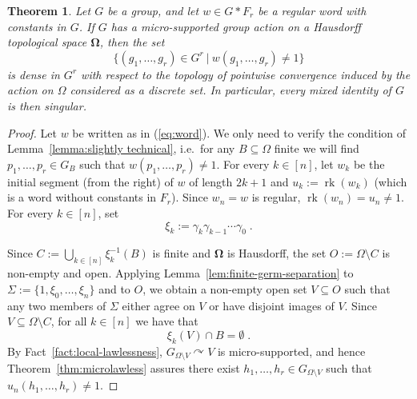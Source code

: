 \documentclass{article}
\newtheorem{theorem}{Theorem}[section]
\theoremstyle{remark}
\theoremstyle{definition}
\def\acts{\curvearrowright}
\DeclareMathOperator{\rk}{rk}
\DeclareMathOperator{\ppww}{pw}
\newcommand{\spOm}{\bm{\Omega}}
\newcommand{\pwom}{\tau_{\ppww}^{\spOm}}
\begin{document}
{\begin{theorem}\label{thm:micro-supported-mixed-identities} Let $G$ be a group, and let $w\in G*F_r$ be a regular word with constants in $G$. If $G$ has a micro-supported group action on a Hausdorff topological space $\spOm$, then the set
\[
  \{(g_1,\ldots,g_r)\in G^r\ \vert \ w(g_1,\ldots,g_r) {\neq} 1\}
\]
is dense in $G^r$ with respect to the topology of pointwise convergence %
 induced by the action {on $\Omega$ considered as a discrete set}. 
In particular, every mixed identity of $G$ is then  singular.
\end{theorem}
\begin{proof}
Let $w$ be written  as in (\ref{eq:word}).  We only need to verify the condition of Lemma~\ref{lemma:slightly technical}, i.e.~for any  $B\subseteq \Omega$ finite we will find $p_1, \dots, p_r\in G_B$ such that ${w}(p_1, \dots, p_r)\neq 1$. For every $k\in [n]$, let ${w}_k$ be the %
{initial segment (from the right)} 
of ${w}$ of length $2k+1$ and $u_k:=\rk({w}_k)$ (which is a word without constants in $F_r$). %
Since ${w}_n=w$ is regular, $\rk({w}_n)=u_n\neq 1$. For every $k\in [n]$, set
\[
  \xi_k:=\gamma_k\gamma_{k-1}\cdots\gamma_0\;.
\]

 Since $
C:=\bigcup_{k\in [n]}\xi_k^{-1}(B)$
is finite and $\spOm$ is Hausdorff, the set $O:=\Omega\setminus C$ is non-empty and open. Applying 
Lemma~\ref{lem:finite-germ-separation} to $ \Sigma:=\{1,\xi_0,\ldots,\xi_n\}$
and to $O$, we obtain a non-empty open set $V\subseteq O$ such that any two
members of $\Sigma$ either agree on $V$ or have disjoint images of $V$. 
Since $V\subseteq \Omega\setminus C$, for all $k\in [n]$ we have that
\begin{equation}\label{eq:cells-avoid-B}
  \xi_k(V)\cap B=\emptyset\;.
\end{equation}
By Fact~\ref{fact:local-lawlessness}, $G_{\Omega\setminus V}\acts V$ is micro-supported, and hence Theorem~\ref{thm:microlawless} assures there exist 
$h_1,\ldots,h_r\in G_{\Omega\setminus V}$ such that $u_n(h_1,\ldots,h_r)\neq 1$.





\end{proof}}
\end{document}
